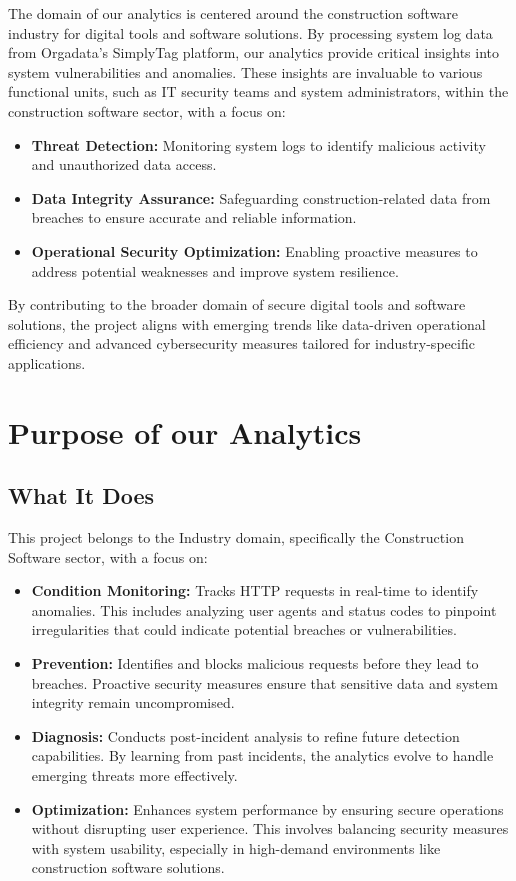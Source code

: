 The domain of our analytics is centered around the construction software industry for digital tools and software solutions. By processing system log data from Orgadata's SimplyTag platform, our analytics provide critical insights into system vulnerabilities and anomalies. These insights are invaluable to various functional units, such as IT security teams and system administrators, within the construction software sector, with a focus on:

\begin{itemize}
	\item \textbf{Threat Detection:} Monitoring system logs to identify malicious activity and unauthorized data access.
	\item \textbf{Data Integrity Assurance:} Safeguarding construction-related data from breaches to ensure accurate and reliable information.
	\item \textbf{Operational Security Optimization:} Enabling proactive measures to address potential weaknesses and improve system resilience.
\end{itemize}

By contributing to the broader domain of secure digital tools and software solutions, the project aligns with emerging trends like data-driven operational efficiency and advanced cybersecurity measures tailored for industry-specific applications.

\chapter{Purpose of our Analytics}

\section{What It Does}

This project belongs to the Industry domain, specifically the Construction Software sector, with a focus on:

\begin{itemize}
	\item \textbf{Condition Monitoring:} Tracks HTTP requests in real-time to identify anomalies. This includes analyzing user agents and status codes to pinpoint irregularities that could indicate potential breaches or vulnerabilities.
	\item \textbf{Prevention:} Identifies and blocks malicious requests before they lead to breaches. Proactive security measures ensure that sensitive data and system integrity remain uncompromised.
	\item \textbf{Diagnosis:} Conducts post-incident analysis to refine future detection capabilities. By learning from past incidents, the analytics evolve to handle emerging threats more effectively.
	\item \textbf{Optimization:} Enhances system performance by ensuring secure operations without disrupting user experience. This involves balancing security measures with system usability, especially in high-demand environments like construction software solutions.
\end{itemize}

